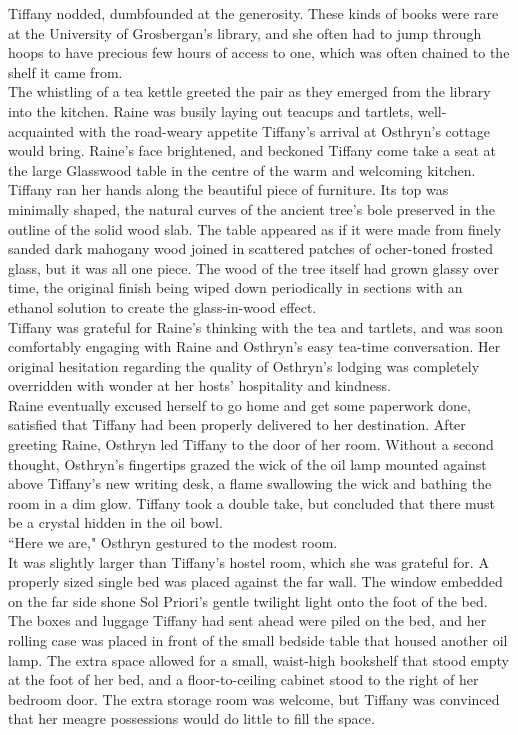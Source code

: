 Tiffany nodded, dumbfounded at the generosity. 
These kinds of books were rare at the University of Grosbergan's library, and she often had to jump through hoops to have precious few hours of access to one, which was often chained to the shelf it came from.\\

The whistling of a tea kettle greeted the pair as they emerged from the library into the kitchen.
Raine was busily laying out teacups and tartlets, well-acquainted with the road-weary appetite Tiffany's arrival at Osthryn's cottage would bring.
Raine's face brightened, and beckoned Tiffany come take a seat at the large Glasswood table in the centre of the warm and welcoming kitchen.
Tiffany ran her hands along the beautiful piece of furniture.
Its top was minimally shaped, the natural curves of the ancient tree's bole preserved in the outline of the solid wood slab.
The table appeared as if it were made from finely sanded dark mahogany wood joined in scattered patches of ocher-toned frosted glass, but it was all one piece.
The wood of the tree itself had grown glassy over time, the original finish being wiped down periodically in sections with an ethanol solution to create the glass-in-wood effect.\\

Tiffany was grateful for Raine's thinking with the tea and tartlets, and was soon comfortably engaging with Raine and Osthryn's easy tea-time conversation.
Her original hesitation regarding the quality of Osthryn's lodging was completely overridden with wonder at her hosts' hospitality and kindness.\\

Raine eventually excused herself to go home and get some paperwork done, satisfied that Tiffany had been properly delivered to her destination.
After greeting Raine, Osthryn led Tiffany to the door of her room.
Without a second thought, Osthryn's fingertips grazed the wick of the oil lamp mounted against above Tiffany's new writing desk, a flame swallowing the wick and bathing the room in a dim glow.
Tiffany took a double take, but concluded that there must be a crystal hidden in the oil bowl.\\

``Here we are," Osthryn gestured to the modest room.\\
It was slightly larger than Tiffany's hostel room, which she was grateful for. 
A properly sized single bed was placed against the far wall. 
The window embedded on the far side shone Sol Priori's gentle twilight light onto the foot of the bed.
The boxes and luggage Tiffany had sent ahead were piled on the bed, and her rolling case was placed in front of the small bedside table that housed another oil lamp.
The extra space allowed for a small, waist-high bookshelf that stood empty at the foot of her bed, and a floor-to-ceiling cabinet stood to the right of her bedroom door.
The extra storage room was welcome, but Tiffany was convinced that her meagre possessions would do little to fill the space.\\

